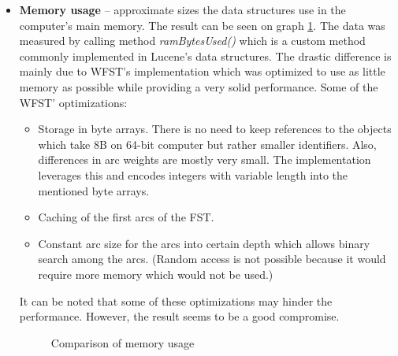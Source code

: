 \begin{itemize}
    \item \textbf{Memory usage} – approximate sizes the data structures use in the computer's main memory.
     The result can be seen on graph \ref{comp_mem}. The data was measured by calling method
     \textit{ramBytesUsed()} which is a custom method commonly implemented in Lucene's data structures.
     The drastic
    difference is mainly due to WFST's implementation which was optimized to use as little memory as possible while
    providing a very solid performance. Some of the WFST' optimizations:
    \begin{itemize}
        \item Storage in byte arrays. There is no need to keep references to the objects which take 8B on 64-bit computer
        but rather smaller identifiers. Also, differences in arc weights are mostly very small. The implementation
        leverages this and encodes integers with variable length into the mentioned byte arrays.
        \item Caching of the first arcs of the FST.
        \item Constant arc size for the arcs into certain depth which allows binary search among the arcs. (Random
        access is not possible because it would require more memory which would not be used.)
    \end{itemize}
    It can be noted that some of these optimizations may hinder the performance. However, the result seems to be a good
    compromise.

    \begin{figure}[htbp]
        \centering
        \caption{Comparison of memory usage}
        \label{comp_mem}
    \end{figure}

\end{itemize}

